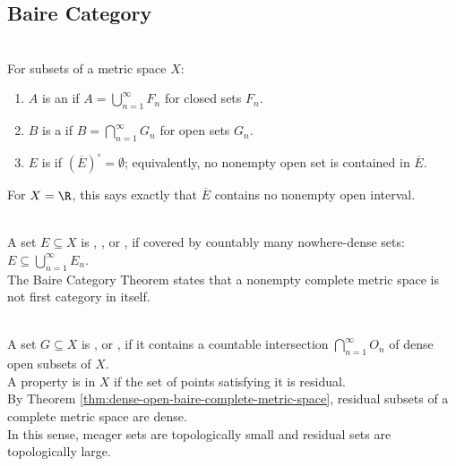 \subsection{Baire Category}

\begin{definition} \label{def:fsigma-gdelta-nowhere-dense} \\
For subsets of a metric space $X$:
\begin{enumerate}[label=(\roman*)]
\setlength{\itemsep}{0pt}
\item $A$ is an  if $A=\bigcup_{n=1}^{\infty}F_n$ for closed sets $F_n$.
\item $B$ is a  if $B=\bigcap_{n=1}^{\infty}G_n$ for open sets $G_n$.
\item $E$ is  if $(\overline{E})^\circ=\emptyset$; equivalently, no nonempty open set is contained in $\overline{E}$.
\end{enumerate}
For $X=\R$, this says exactly that $\overline{E}$ contains no nonempty open interval.
\end{definition}

\begin{definition} \label{def:first-category-set} \\
A set $E\subseteq X$ is , , or , if covered by countably many nowhere-dense sets: $E\subseteq \bigcup\limits_{n=1}^{\infty}E_n$.\\
The Baire Category Theorem states that a nonempty complete metric space is not first category in itself.
\end{definition}

\begin{definition} \label{def:residual-thick-generic-set} \\
A set $G\subseteq X$ is , or , if it contains a countable intersection $\bigcap\limits_{n=1}^{\infty}O_n$ of dense open subsets of $X$.\\
A property is  in $X$ if the set of points satisfying it is residual.\\
By Theorem \ref{thm:dense-open-baire-complete-metric-space}, residual subsets of a complete metric space are dense.\\
In this sense, meager sets are topologically small and residual sets are topologically large.
\end{definition}

